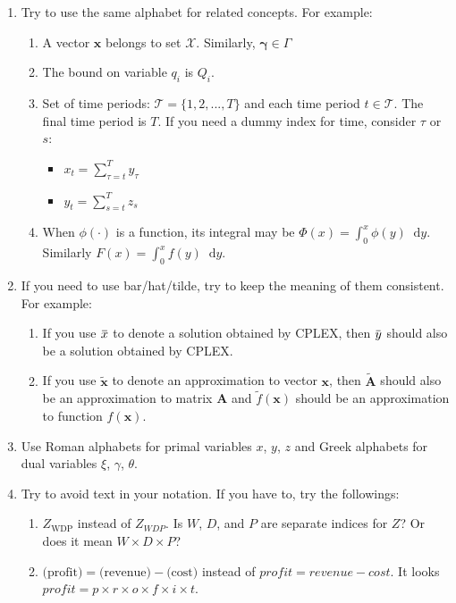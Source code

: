\documentclass[letterpaper, 11pt]{article}
\renewcommand{\vec}[1]{\bm{#1}}
\newcommand{\mat}[1]{\bm{#1}}
\newcommand{\set}[1]{\mathcal{#1}}
\newcommand{\dy}{\mathop{}\!\mathrm{d}y}
\renewcommand{\bar}[1]{\mkern 1.5mu\overline{\mkern-1.5mu#1\mkern-1.5mu}\mkern 1.5mu}
\begin{document}
\begin{enumerate}
\item Try to use the same alphabet for related concepts. For example:
	\begin{enumerate}
	\item A vector $\vec{x}$ belongs to set $\set{X}$. Similarly, $\vec{\gamma}\in\set{\Gamma}$
	\item The bound on variable $q_i$ is $Q_i$.
	\item Set of time periods: $\set{T} = \{1,2,...,T\}$ and each time period $t\in\set{T}$. The final time period is $T$. If you need a dummy index for time, consider $\tau$ or $s$:
		\begin{itemize}
		\item $\displaystyle x_t = \sum_{\tau=t}^T y_\tau$
		\item $\displaystyle y_t = \sum_{s=t}^T z_s$		
		\end{itemize}
	\item When $\phi(\cdot)$ is a function, its integral may be $\Phi(x) = \int_0^x \phi(y) \dy$. Similarly $F(x) = \int_0^x f(y) \dy$.
	\end{enumerate}
\item If you need to use bar/hat/tilde, try to keep the meaning of them consistent. For example:
	\begin{enumerate}
	\item If you use $\bar{x}$ to denote a solution obtained by CPLEX, then $\bar{y}$ should also be a solution obtained by CPLEX.
	\item If you use $\tilde{\vec{x}}$ to denote an approximation to vector $\vec{x}$, then $\tilde{\mat{A}}$ should also be an approximation to matrix $\mat{A}$ and $\tilde{f}(\vec{x})$ should be an approximation to function $f(\vec{x})$.
	\end{enumerate}
\item Use Roman alphabets for primal variables $x$, $y$, $z$ and Greek alphabets for dual variables $\xi$, $\gamma$, $\theta$.
\item Try to avoid text in your notation. If you have to, try the followings:
	\begin{enumerate}
	\item $Z_{\text{WDP}}$ instead of $Z_{WDP}$. Is $W$, $D$, and $P$ are separate indices for $Z$? Or does it mean $W \times D \times P$?
	\item $\text{(profit)} = \text{(revenue)} - \text{(cost)} $ instead of $profit = revenue - cost$. It looks $profit = p\times r\times o\times f\times i\times t$.

\end{enumerate}
\end{enumerate}
\end{document}

